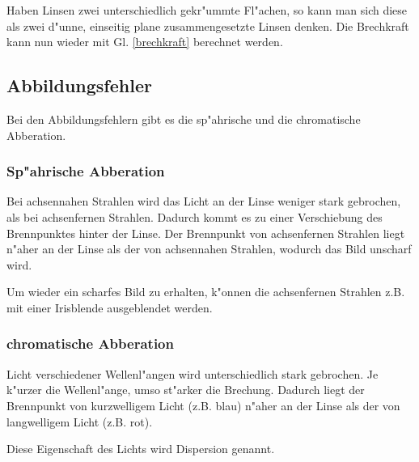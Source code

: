 	Haben Linsen zwei unterschiedlich gekr"ummte Fl"achen, so kann man sich diese als zwei d"unne, einseitig plane zusammengesetzte Linsen denken.
	Die Brechkraft kann nun wieder mit Gl. \eqref{brechkraft} berechnet werden.

	\subsection{Abbildungsfehler} %
	\label{sub:abbildungsfehler}

	Bei den Abbildungsfehlern gibt es die sp"ahrische und die chromatische Abberation.
	
	\subsubsection{Sp"ahrische Abberation} %
 	\label{sub:sp_ahrische_abberation}
 
  	Bei achsennahen Strahlen wird das Licht an der Linse weniger stark gebrochen, als bei achsenfernen Strahlen.
  	Dadurch kommt es zu einer Verschiebung des Brennpunktes hinter der Linse.
  	Der Brennpunkt von achsenfernen Strahlen liegt n"aher an der Linse als der von achsennahen Strahlen, wodurch das Bild unscharf wird.

   Um wieder ein scharfes Bild zu erhalten, k"onnen die achsenfernen Strahlen z.B. mit einer Irisblende ausgeblendet werden.

   \subsubsection{chromatische Abberation} %
   \label{sub:chromatische_abberation}
   
   Licht verschiedener Wellenl"angen wird unterschiedlich stark gebrochen.
   Je k"urzer die Wellenl"ange, umso st"arker die Brechung.
   Dadurch liegt der Brennpunkt von kurzwelligem Licht (z.B. blau) n"aher an der Linse als der von langwelligem Licht (z.B. rot).

   Diese Eigenschaft des Lichts wird Dispersion genannt.

